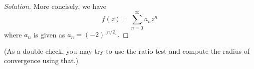 \documentclass[12pt]{article}
\theoremstyle{definition}
\numberwithin{thm}{section}
\newenvironment{soln}{\begin{proof}[Solution]}{\end{proof}}
\begin{document}
\begin{enumerate}
\begin{soln}
		More concisely, we have
		\begin{equation*} 
			f(z) = \sum_{n=0}^{\infty}a_nz^n
		\end{equation*}
		where $a_n$ is given as $a_n = (-2)^{\lfloor n/2\rfloor}.$
	\end{soln}
	(As a double check, you may try to use the ratio test and compute the radius of convergence using that.)
\end{enumerate}	
\end{document}
